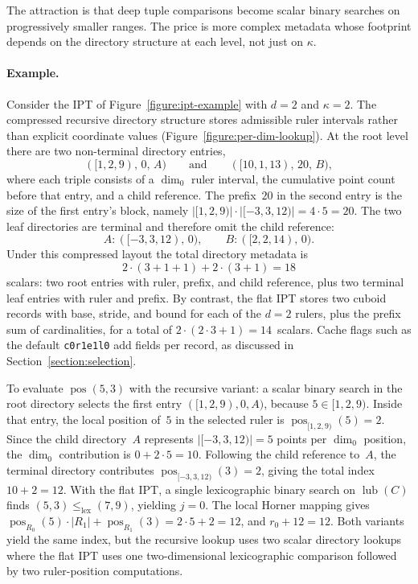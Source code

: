 \documentclass[manuscript,screen,review]{acmart}
\theoremstyle{definition}
\theoremstyle{plain}
\begin{document}
The attraction is that deep tuple comparisons become scalar binary searches on progressively smaller ranges. The price is more complex metadata whose footprint depends on the directory structure at each level, not just on $\kappa$.

\paragraph{Example.}
Consider the IPT of Figure~\ref{figure:ipt-example} with $d=2$ and $\kappa=2$.
The compressed recursive directory structure stores admissible ruler intervals rather than explicit coordinate values (Figure~\ref{figure:per-dim-lookup}).
At the root level there are two non-terminal directory entries,
\[
  ([1,2,9),\,0,\,A)
  \qquad\text{and}\qquad
  ([10,1,13),\,20,\,B),
\]
where each triple consists of a $\dim_0$ ruler interval, the cumulative point count before that entry, and a child reference.
The prefix~$20$ in the second entry is the size of the first entry's block, namely $|[1,2,9)|\cdot|[-3,3,12)| = 4\cdot 5 = 20$.
The two leaf directories are terminal and therefore omit the child reference:
\[
  A:([-3,3,12),\,0),
  \qquad
  B:([2,2,14),\,0).
\]
Under this compressed layout the total directory metadata is
\[
  2\cdot(3+1+1) + 2\cdot(3+1) = 18
\]
scalars: two root entries with ruler, prefix, and child reference, plus two terminal leaf entries with ruler and prefix.
By contrast, the flat IPT stores two cuboid records with base, stride, and
bound for each of the $d=2$ rulers, plus the prefix sum
of cardinalities, for a total of
$2\cdot(2\cdot 3 + 1) = 14$~scalars. Cache flags such as the
default \texttt{c0r1e1l0} add fields per record, as discussed in
Section~\ref{section:selection}.

To evaluate $\operatorname{pos}(5,3)$ with the recursive variant:
a scalar binary search in the root directory selects the first entry
$([1,2,9),0,A)$, because $5\in[1,2,9)$.
Inside that entry, the local position of~$5$ in the selected ruler is
$\operatorname{pos}_{[1,2,9)}(5)=2$.
Since the child directory~$A$ represents $|[-3,3,12)| = 5$ points per
$\dim_0$ position, the $\dim_0$ contribution is
$0 + 2\cdot 5 = 10$.
Following the child reference to~$A$, the terminal directory contributes
$\operatorname{pos}_{[-3,3,12)}(3)=2$, giving the total index
$10+2=12$.
With the flat IPT, a single lexicographic binary search on
$\operatorname{lub}(C)$ finds
$(5,3)\le_{\mathrm{lex}}(7,9)$, yielding $j=0$.
The local Horner mapping gives
$\operatorname{pos}_{R_0}(5)\cdot|R_1|+\operatorname{pos}_{R_1}(3)
 =2\cdot 5+2=12$,
and $r_0+12=12$.
Both variants yield the same index, but the recursive lookup uses two
scalar directory lookups where the flat IPT uses one two-dimensional
lexicographic comparison followed by two ruler-position computations.
\end{document}
